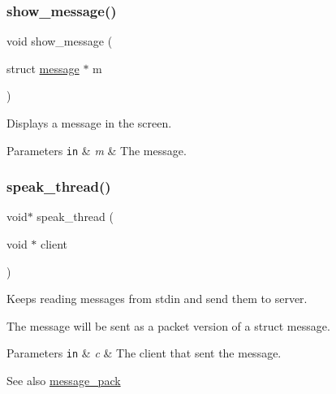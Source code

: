 \subsubsection{\texorpdfstring{show\+\_\+message()}{show\_message()}}
{\footnotesize\ttfamily void show\+\_\+message (\begin{DoxyParamCaption}\item[{struct \hyperlink{structmessage}{message} $\ast$}]{m }\end{DoxyParamCaption})}



Displays a message in the screen. 


\begin{DoxyParams}[1]{Parameters}
\mbox{\tt in}  & {\em m} & The message. \\
\hline
\end{DoxyParams}
\mbox{\label{zip-zop-client_8c_a7ca038c133aa6aca1c539e69d4ee675f}} 
\subsubsection{\texorpdfstring{speak\+\_\+thread()}{speak\_thread()}}
{\footnotesize\ttfamily void$\ast$ speak\+\_\+thread (\begin{DoxyParamCaption}\item[{void $\ast$}]{client }\end{DoxyParamCaption})}



Keeps reading messages from {\ttfamily stdin} and send them to server. 

The message will be sent as a packet version of a struct message.


\begin{DoxyParams}[1]{Parameters}
\mbox{\tt in}  & {\em c} & The client that sent the message.\\
\hline
\end{DoxyParams}
\begin{DoxySeeAlso}{See also}
\hyperlink{message_8h_a0e07715664284f7a821216ca83317e60}{message\+\_\+pack} 
\end{DoxySeeAlso}
